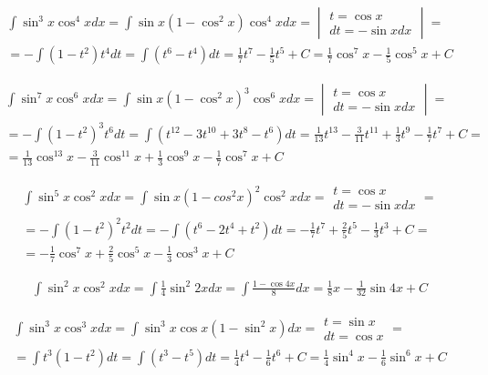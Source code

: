 
\begin{gather*}\int \sin^3 x \cos^4 x dx = \int \sin x(1-\cos^2 x)\cos^4 x dx = \begin{vmatrix} t=\cos x \\ dt=-\sin x dx \end{vmatrix} =  \\
= -\int (1-t^2)t^4dt = \int (t^6-t^4)dt = \frac{1}{7}t^7-\frac{1}{5}t^5+C = \frac{1}{7}\cos^7 x - \frac{1}{5}\cos^5 x + C\end{gather*}



\begin{gather*}\int \sin^7 x \cos^6 x dx = \int \sin x(1-\cos^2 x)^3\cos^6 x dx = \begin{vmatrix} t=\cos x \\ dt=-\sin x dx \end{vmatrix} =  \\
= -\int (1-t^2)^3t^6dt = \int (t^{12}-3t^{10}+3t^8-t^6)dt = \frac{1}{13}t^{13}-\frac{3}{11}t^{11}+\frac{1}{3}t^9-\frac{1}{7}t^7 + C =  \\
= \frac{1}{13}\cos^{13}x-\frac{3}{11}\cos^{11}x+\frac{1}{3}\cos^9x-\frac{1}{7}\cos^7 x+ C\end{gather*}



\begin{gather*}\int \sin^5 x \cos^2 x dx = \int \sin x (1-cos^2 x)^2\cos^2 x dx = \begin{array}{|l|} t=\cos x \\ dt=-\sin x dx \end{array} =  \\
= -\int (1-t^2)^2t^2dt = -\int (t^6-2t^4+t^2)dt = -\frac{1}{7}t^7+\frac{2}{5}t^5-\frac{1}{3}t^3+C =  \\
= -\frac{1}{7}\cos^7x+\frac{2}{5}\cos^5x-\frac{1}{3}\cos^3x+C\end{gather*}



\begin{gather*}\int \sin^2 x \cos^2 x dx = \int \frac{1}{4}\sin^2 2xdx = \int \frac{1-\cos 4x}{8}dx = \frac{1}{8}x-\frac{1}{32}\sin 4x +C\end{gather*}



\begin{gather*}\int \sin^3 x \cos^3 x dx = \int \sin^{3}x \cos x(1-\sin^{2}x)dx = \begin{array}{|l|} t=\sin x \\ dt=\cos x \end{array} =  \\
= \int t^3(1-t^2)dt = \int (t^3-t^5)dt = \frac{1}{4}t^4-\frac{1}{6}t^6+C = \frac{1}{4}\sin^4x-\frac{1}{6}\sin^6x+C\end{gather*}


